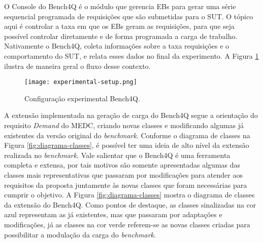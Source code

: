 O Console do Bench4Q é o módulo que gerencia EBs para gerar uma série sequencial programada de requisições que são submetidas para o SUT. O tópico aqui é controlar a taxa em que os EBs geram as requisições, para que seja possível controlar diretamente e de forma programada a carga de trabalho. Nativamente o Bench4Q, coleta informações sobre a taxa requisições e o comportamento do SUT, e relata esses dados no final da experimento. A Figura \ref{fig:experimental-setup} ilustra de maneira geral o fluxo desse contexto.

\begin{figure}[!htb]
	\centering
	\texttt{[image: experimental-setup.png]}	
	\caption{Configuração experimental Bench4Q.}
	\label{fig:experimental-setup}
\end{figure}

A extensão implementada na geração de carga do Bench4Q segue a orientação do requisito \textit{Demand} do MEDC, criando novas classes e modificando algumas já existentes da versão original do \textit{benchmark}. Conforme o diagrama de classes na Figura \ref{fig:diagrama-classes}, é possível ter uma ideia de alto nível da extensão realizada no \textit{benchmark}. Vale salientar que o Bench4Q é uma ferramenta completa e extensa, por tais motivos são somente apresentadas algumas das classes mais representativas que passaram por modificações para atender aos requisitos da proposta  juntamente às novas classes que foram necessárias para cumprir o objetivo. A Figura \ref{fig:diagrama-classes} mostra o diagrama de classes da extensão do Bench4Q. Como pontos de destaque, as classes sinalizadas na cor azul representam as já existentes, mas que passaram por adaptações e modificações, já as classes na cor verde referem-se as novas classes criadas para possibilitar a modulação da carga do \textit{benchmark}.

